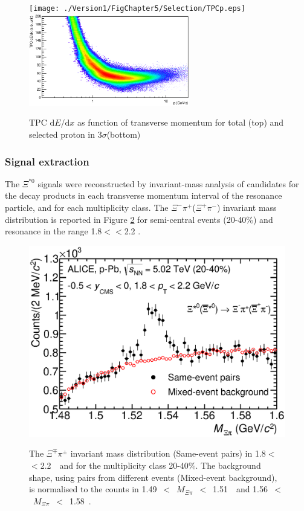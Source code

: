 \begin{figure}[htbp]
\begin{center}
\texttt{[image: ./Version1/FigChapter5/Selection/TPCp.eps]}
\hspace{0.5cm}
\includegraphics[width=7.0cm]{./Version1/FigChapter5/Selection/TPCpAfter.eps}
\label{fig:TPCp} 
\caption{ TPC $\mathrm{d}E/\mathrm{d}x$ as function of transverse momentum for total (top) and selected proton in 3$\sigma$(bottom) }
\end{center}
\end{figure}
 
\newpage
\subsubsection{Signal extraction}\label{sec:pPb:signal}

The $\Xi^{*0}$ signals were reconstructed by invariant-mass analysis 
of candidates for the decay products in each transverse momentum interval of the resonance 
particle, and for each multiplicity class. The  $\Xi^-\pi^+$($\Xi^+\pi^-$) invariant mass distribution is reported in Figure \ref{fig:sigpPbb} for semi-central events (20-40\%) and resonance in the range 1.8$<$\pt$<$2.2 \gmom.


\begin{figure}[htbp]
\begin{center}
\includegraphics[width=12.0cm]{./Version1/FigChapter5/Extraction/SigpPb_Before.eps}
\hspace{0.5cm}
\label{fig:sigpPbb} 
\caption{ The $\Xi^{\mp}\pi^{\pm}$ invariant mass distribution (Same-event pairs) in 
1.8$<$ \pt $<$2.2~\gmom~and for the multiplicity class 20-40\%. The background shape, 
using pairs from different events (Mixed-event background), is normalised to the counts in 
1.49~$<$~$M_{\Xi\pi}$~$<$~1.51~\Gmass~and 1.56~$<$~$M_{\Xi\pi}$~$<$~1.58~\Gmass. }
\end{center}
\end{figure}

